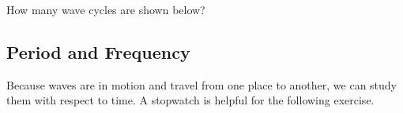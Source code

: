 \documentclass[main.tex]{subfiles}
\begin{document}
\begin{exercise}
    How many wave cycles are shown below?

\begin{center}
\end{center}
\end{exercise}

\cyanhrule

\subsection{Period and Frequency} \label{BcrbfW}
Because waves are in motion and travel from one place to another, we can study them with respect to time. A stopwatch is helpful for the following exercise. 
\end{document}
